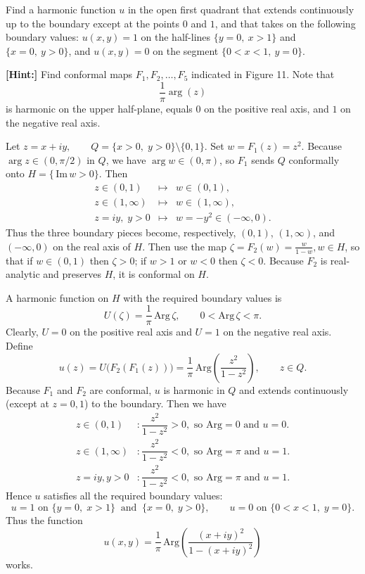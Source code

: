 \documentclass[12pt]{article}
\begin{document}
\begin{statement}[8.5.8]
Find a harmonic function $u$ in the open first quadrant that extends continuously up to the boundary except at the points $0$ and $1$, and that takes on the following boundary values: $u(x,y) = 1$ on the half-lines $\{ y = 0,\ x > 1 \}$ and $\{ x = 0,\ y > 0 \}$, and $u(x,y) = 0$ on the segment $\{ 0 < x < 1,\ y = 0 \}$.

\par \textbf{[Hint:]} Find conformal maps $F_1, F_2, \dots, F_5$ indicated in Figure 11. Note that
$$
\frac{1}{\pi} \arg(z)
$$
is harmonic on the upper half-plane, equals $0$ on the positive real axis, and $1$ on the negative real axis.
\end{statement}
\begin{newproof}
  Let $ z=x+iy,\qquad Q=\{x>0,\;y>0\}\setminus\{0,1\}. $ Set $ w=F_1(z)=z^{2}. $ Because $\arg z\in(0,\pi/2)$ in $Q$, we have $\arg w\in(0,\pi)$, so $F_1$ sends $Q$ conformally onto $ H=\{\,\text{Im}\,w>0\}. $ Then
  $$ \begin{array}{ccc}
        z\in(0,1)&\longmapsto&w\in(0,1),\\[6pt]
        z\in(1,\infty)&\longmapsto&w\in(1,\infty),\\[6pt]
        z=iy,\;y>0&\longmapsto&w=-y^{2}\in(-\infty,0).
    \end{array} $$
    Thus the three boundary pieces become, respectively, $(0,1)$, $(1,\infty)$, and $(-\infty,0)$ on the real axis of $H$.
    Then use the map $ \zeta=F_2(w)=\frac{w}{1-w}, w\in H $, so that if $w\in(0,1)$ then $\zeta>0$; if $w>1$ or $w<0$ then $\zeta<0$. Because $F_2$ is real-analytic and preserves $H$, it is conformal on $H$.
    \par A harmonic function on $H$ with the required boundary values is
        $$ U(\zeta)=\frac{1}{\pi}\,\text{Arg}\,\zeta, \qquad 0<\text{Arg}\,\zeta<\pi .$$
    Clearly, $U=0$ on the positive real axis and $U=1$ on the negative real axis. Define
    $$ u(z)=U\!\bigl(F_2(F_1(z))\bigr)
      =\frac{1}{\pi}\,\text{Arg}\!\left(\frac{z^{2}}{1-z^{2}}\right),
      \qquad z\in Q. $$
    Because $F_1$ and $F_2$ are conformal, $u$ is harmonic in $Q$ and extends continuously (except at $z=0,1$) to the boundary. Then we have
    \begin{align*}
        z\in(0,1) &: \dfrac{z^{2}}{1-z^{2}}>0, \text{ so } \text{Arg}=0 \text{ and } u=0. \\
        z\in(1,\infty) &: \dfrac{z^{2}}{1-z^{2}}<0, \text{ so } \text{Arg}=\pi \text{ and } u=1.\\
        z=iy, y>0 &: \dfrac{z^{2}}{1-z^{2}}<0, \text{ so } \text{Arg}=\pi \text{ and } u=1.
    \end{align*}
    Hence $u$ satisfies all the required boundary values:
    $$ u=1 \text{ on } \{y=0,\;x>1\}\ \text{ and }\ \{x=0,\;y>0\},\qquad u=0 \text{ on } \{0<x<1,\;y=0\}. $$
    Thus the function  
    $$ u(x,y)=\frac{1}{\pi}\,\text{Arg}\!\left(\frac{(x+iy)^{2}}{1-(x+iy)^{2}}\right) $$
    works.
\end{newproof}
\end{document}
